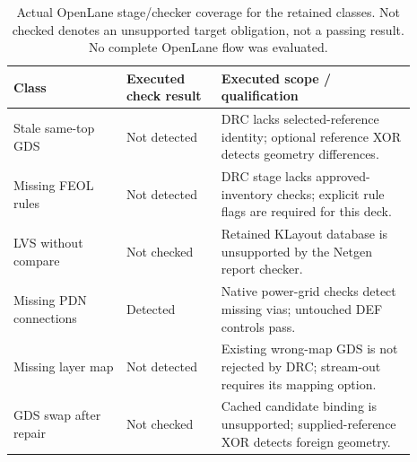 \begin{table}[htbp]\centering\small\setlength{\tabcolsep}{4pt}
\caption{Actual OpenLane stage/checker coverage for the retained classes. Not checked denotes an unsupported target obligation, not a passing result. No complete OpenLane flow was evaluated.}\label{tab:externalcoverage}
\begin{tabular}{@{}p{0.25\linewidth}p{0.21\linewidth}p{0.43\linewidth}@{}}\toprule
Class & Executed check result & Executed scope / qualification \\
\midrule
Stale same-top GDS & Not detected & DRC lacks selected-reference identity; optional reference XOR detects geometry differences. \\
Missing FEOL rules & Not detected & DRC stage lacks approved-inventory checks; explicit rule flags are required for this deck. \\
LVS without compare & Not checked & Retained KLayout database is unsupported by the Netgen report checker. \\
Missing PDN connections & Detected & Native power-grid checks detect missing vias; untouched DEF controls pass. \\
Missing layer map & Not detected & Existing wrong-map GDS is not rejected by DRC; stream-out requires its mapping option. \\
GDS swap after repair & Not checked & Cached candidate binding is unsupported; supplied-reference XOR detects foreign geometry. \\
\bottomrule\end{tabular}\end{table}
